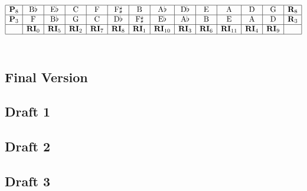 \documentclass{article}
\begin{document}
\[\begin{array}{|c|c|c|c|c|c|c|c|c|c|c|c|c|c|}
\hline
\mathbf{P}_8&\mathrm{B}\flat&\mathrm{E}\flat&\mathrm{C}&\mathrm{F}&\mathrm{F}\sharp&\mathrm{B}&\mathrm{A}\flat&\mathrm{D}\flat&\mathrm{E}&\mathrm{A}&\mathrm{D}&\mathrm{G}&\mathbf{R}_8\\
\hline
\mathbf{P}_3&\mathrm{F}&\mathrm{B}\flat&\mathrm{G}&\mathrm{C}&\mathrm{D}\flat&\mathrm{F}\sharp&\mathrm{E}\flat&\mathrm{A}\flat&\mathrm{B}&\mathrm{E}&\mathrm{A}&\mathrm{D}&\mathbf{R}_3\\
\hline
&\mathbf{RI}_0&\mathbf{RI}_5&\mathbf{RI}_2&\mathbf{RI}_7&\mathbf{RI}_8&\mathbf{RI}_1&\mathbf{RI}_{10}&\mathbf{RI}_3&\mathbf{RI}_6&\mathbf{RI}_{11}&\mathbf{RI}_4&\mathbf{RI}_9&\\
\hline
\end{array}\]\\

\newpage
\begin{center}
\vspace*{\fill}
\LARGE
\subsection{Final Version}
\vspace*{\fill}
%
\end{center}

\newpage
\begin{center}
\vspace*{\fill}
\LARGE
\subsection{Draft 1}
\vspace*{\fill}
%
\end{center}
\newpage
\begin{center}
\vspace*{\fill}
\LARGE
\subsection{Draft 2}
\vspace*{\fill}
%
\end{center}
\newpage
\begin{center}
\vspace*{\fill}
\LARGE
\subsection{Draft 3}
\vspace*{\fill}
%
\end{center}
\newpage
\end{document}

